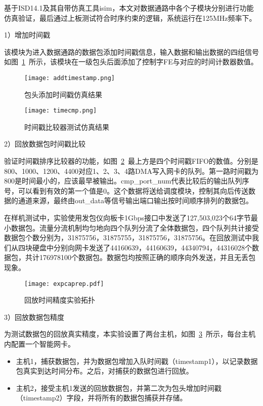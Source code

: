 基于ISD14.1及其自带仿真工具isim，本文对数据通路中各个子模块分别进行功能仿真验证，最后通过上板测试符合时序约束的逻辑，系统运行在125MHz频率下。

1）增加时间戳

该模块为进入数据通路的数据包添加时间戳信息，输入数据和输出数据的四组信号如图~\ref{fig:addtimestamp}~所示，该模块在一级包头后面添加了控制字FE与对应的时间计数器数值。

\begin{figure}[!ht]
	\centering 
	\texttt{[image: addtimestamp.png]}
	\caption{包头添加时间戳仿真结果} \label{fig:addtimestamp}
\end{figure}

\begin{figure}[!ht]
	\centering 
	\vspace{1.5mm} 
	\texttt{[image: timecmp.png]}
	\caption{时间戳比较器测试仿真结果} \label{fig:timecmp}
\end{figure}

2）回放数据包时间戳比较

验证时间戳排序比较器的功能，如图~\ref{fig:timecmp}~最上方是四个时间戳FIFO的数值。分别是800、1000、1200、4400对应1、2、3、4路DMA写入网卡的队列。第一路时间戳为800是时间最小的，应该最早被输出。cmp\_port\_num代表比较后的输出队列序号，可以看到有效的第一个值是0。这个数据将送给调度模块，控制其向后传送数据的通道来源，最终由out\_data等信号输出端口输出按时间顺序排列的数据包。

在样机测试中，实验使用发包仪向板卡1Gbps接口中发送了127,503,023个64字节最小数据包。流量分流机制均匀地向四个队列分流了全体数据包，四个队列共计接受数据包个数分别为，31875756，31875755，31875756，31875756。在回放测试中我们从四块硬盘中分别向网卡发送了44160639，44160639，44340794，44316028个数据包，共计176978100个数据包。数据包均按照正确的顺序向外发送，并且无丢包现象。

\begin{figure}[!ht]
	\centering 
	\vspace{-1.5mm} 
	\texttt{[image: expcaprep.pdf]}
	\caption{回放时间精度实验拓扑} \label{fig:expcaprep}
\end{figure}

3）回放数据包精度

为测试数据包的回放真实精度，本实验设置了两台主机，如图~\ref{fig:expcaprep}~所示，每台主机内配置一个智能网卡。

\begin{itemize}
	\item 主机1，捕获数据包，并为数据包增加入队时间戳（timestamp1），以记录数据包真实到达时间分布。之后，对捕获的数据包进行回放。
	\item 主机2，接受主机1发送的回放数据包，并第二次为包头增加时间戳（timestamp2）字段，并将所有的数据包捕获并存储。
\end{itemize}

